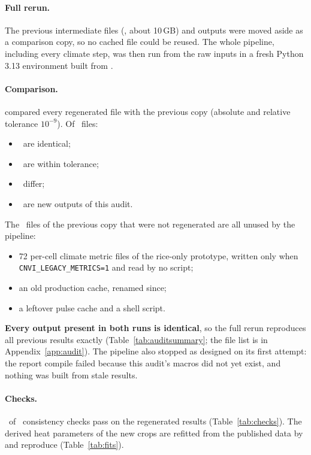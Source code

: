 \paragraph{Full rerun.} The previous intermediate files (, about 10\,GB) and outputs were moved
aside as a comparison copy, so no cached file could be reused. The whole pipeline, including every climate step,
was then run from the raw inputs in a fresh Python 3.13 environment built from .

\paragraph{Comparison.}  compared every regenerated file with the previous copy
(absolute and relative tolerance $10^{-9}$). Of \auditFiles\ files:
\begin{itemize}
\item \auditIdentical\ are identical;
\item \auditWithinTolerance\ are within tolerance;
\item \auditDiffers\ differ;
\item \auditNew\ are new outputs of this audit.
\end{itemize}
The \auditMissing\ files of the previous copy that were not regenerated are all unused by the pipeline:
\begin{itemize}
\item 72 per-cell climate metric files of the rice-only prototype, written only when
\texttt{CNVI\_LEGACY\_METRICS=1} and read by no script;
\item an old production cache, renamed since;
\item a leftover pulse cache and a shell script.
\end{itemize}
\textbf{Every output present in both runs is identical}, so the full rerun reproduces all previous results exactly
(Table~\ref{tab:auditsummary}; the file list is in Appendix~\ref{app:audit}). The pipeline also stopped as designed
on its first attempt: the report compile failed because this audit's macros did not yet exist, and nothing was
built from stale results.

\begin{table}[H]\centering\small\caption{Rerun from raw inputs compared with the previous outputs.}\label{tab:auditsummary}

\end{table}

\paragraph{Checks.} \checksPassed\ of \checksN\ consistency checks pass on the regenerated results
(Table~\ref{tab:checks}). The derived heat parameters of the new crops are refitted from the published data by
 and reproduce  (Table~\ref{tab:fits}).

